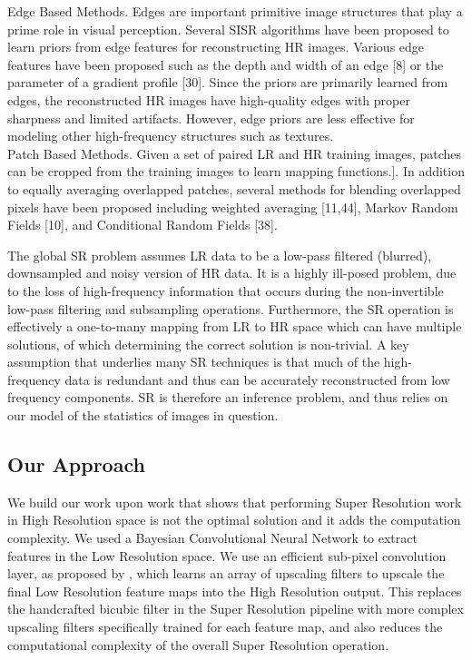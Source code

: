 Edge Based Methods. Edges are important primitive image structures that
play a prime role in visual perception. Several SISR algorithms have been proposed to learn priors from edge features for reconstructing HR images. Various edge features have been proposed such as the depth and width of an edge [8] or the parameter of a gradient profile [30]. Since the priors are primarily learned from edges, the reconstructed HR images have high-quality edges with proper sharpness and limited artifacts. However, edge priors are less effective for modeling other high-frequency structures such as textures.\\

Patch Based Methods. Given a set of paired LR and HR training images,
patches can be cropped from the training images to learn mapping functions.]. In addition to equally averaging overlapped patches, several methods for blending overlapped pixels have been proposed including weighted averaging [11,44], Markov Random Fields [10], and Conditional Random Fields [38].



The global \ac{SR} problem assumes \ac{LR} data to be a low-pass filtered (blurred), downsampled and noisy version of \ac{HR} data. It is a highly ill-posed problem, due to the loss of high-frequency information that occurs during the non-invertible low-pass filtering and subsampling operations. Furthermore, the SR operation is effectively a one-to-many mapping from \ac{LR} to \ac{HR} space which can have multiple solutions, of which determining the correct solution is non-trivial. A key assumption that underlies many \ac{SR} techniques is that much of the high-frequency data is redundant and thus can be accurately reconstructed from low frequency components. \ac{SR} is therefore an inference problem, and thus relies on our model of the statistics of images in question.


\subsection{Our Approach}

We build our work upon \citet{DBLP:journals/corr/ShiCHTABRW16} work that shows that performing Super Resolution work in High Resolution space is not the optimal solution and it adds the computation complexity. We used a Bayesian Convolutional Neural Network to extract features in the Low Resolution space. We use an efficient sub-pixel convolution layer, as proposed by \citet{DBLP:journals/corr/ShiCHTABRW16}, which learns an array of upscaling filters to upscale the final Low Resolution feature maps into the High Resolution output. This replaces the handcrafted bicubic filter in the Super Resolution pipeline with more complex upscaling filters specifically trained for each feature map, and also reduces the computational complexity of the overall Super Resolution operation.


